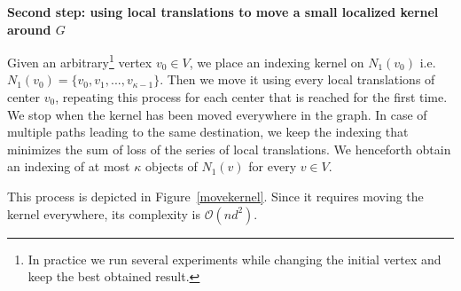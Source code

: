 \noindent\textbf{Second step: using local translations to move a small localized kernel around $G$}

Given an arbitrary\footnote{In practice we run several experiments while changing the initial vertex and keep the best obtained result.} vertex $v_0 \in V$, we place an indexing kernel on $N_1(v_0)$ i.e. $N_1(v_0) = \{v_0, v_1, ..., v_{\kappa-1}\}$. Then we move it using every local translations of center $v_0$, repeating this process for each center that is reached for the first time. We stop when the kernel has been moved everywhere in the graph. In case of multiple paths leading to the same destination, we keep the indexing that minimizes the sum of loss of the series of local translations. We henceforth obtain an indexing of at most $\kappa$ objects of $N_1(v)$ for every $v \in V$.

This process is depicted in Figure~\ref{movekernel}. Since it requires moving the kernel everywhere, its complexity is $\mathcal{O}(n d^2)$.\\

